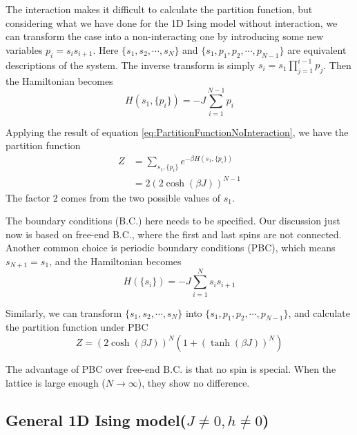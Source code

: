 \documentclass[11pt]{article}
\begin{document}
	The interaction makes it difficult to calculate the partition function, 
	but considering what we have done for the 1D Ising model without interaction, 
	we can transform the case into a non-interacting one by introducing some new variables $p_i = s_i s_{i+1}$.
	Here $\{s_1, s_2, \cdots, s_N\}$ and $\{s_1, p_1, p_2, \cdots, p_{N-1}\}$ are equivalent descriptions of the system.
	The inverse transform is simply $s_i = s_1 \prod_{j=1}^{i-1} p_j$.
	Then the Hamiltonian becomes
	\begin{equation} \label{eq:Hamiltonian1DNoFieldTransformed}
		H(s_1, \{p_i\}) = -J \sum_{i=1}^{N-1} p_i
	\end{equation}

	Applying the result of equation \ref{eq:PartitionFunctionNoInteraction}, we have the partition function
	\begin{equation} \label{eq:PartitionFunction1DNoField}
		\begin{aligned}
			Z &= \sum_{s_1, \{p_i\}} e^{-\beta H(s_1, \{p_i\})} \\
			&= 2(2\cosh(\beta J))^{N-1}
		\end{aligned}
	\end{equation}
	The factor 2 comes from the two possible values of $s_1$.

	The boundary conditions (B.C.) here needs to be specified.
	Our discussion just now is based on free-end B.C., where the first and last spins are not connected.
	Another common choice is periodic boundary conditions (PBC), which means $s_{N+1} = s_1$, and the Hamiltonian becomes
	\begin{equation} \label{eq:Hamiltonian1DNoFieldPeriodic}
		H(\{s_i\}) = -J \sum_{i=1}^{N} s_i s_{i+1}
	\end{equation}

	Similarly, we can transform $\{s_1, s_2, \cdots, s_N\}$ into $\{s_1, p_1, p_2, \cdots, p_{N-1}\}$, 
	and calculate the partition function under PBC
	\begin{equation} \label{eq:PartitionFunction1DNoFieldPeriodic}
		Z = (2\cosh(\beta J))^N(1 + (\tanh(\beta J))^N)
	\end{equation}

	The advantage of PBC over free-end B.C. is that no spin is special.
	When the lattice is large enough ($N \to \infty$), they show no difference.

	\subsection{General 1D Ising model($J\neq0, h\neq0$)}
\end{document}
